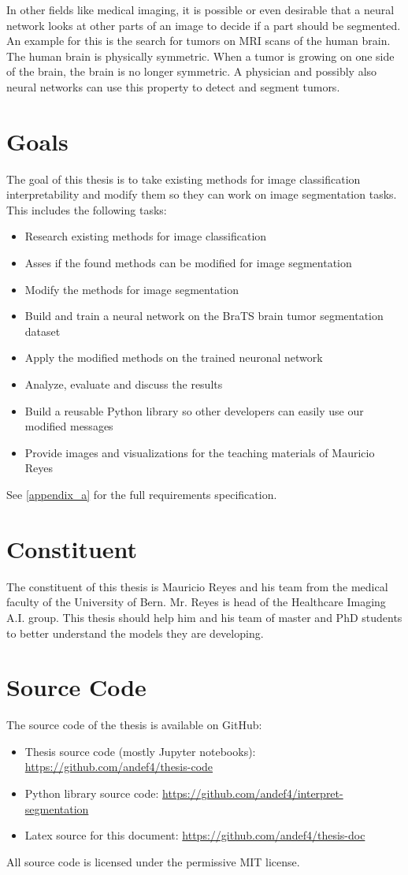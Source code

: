 In other fields like medical imaging, it is possible or even desirable that a neural network looks at other parts of an image to decide if a part should be segmented. An example for this is the search for tumors on MRI scans of the human brain. The human brain is physically symmetric. When a tumor is growing on one side of the brain, the brain is no longer symmetric. A physician and possibly also neural networks can use this property to detect and segment tumors.

\section{Goals}
The goal of this thesis is to take existing methods for image classification interpretability and modify them so they can work on image segmentation tasks. This includes the following tasks:
\begin{itemize}
    \item Research existing methods for image classification
    \item Asses if the found methods can be modified for image segmentation
    \item Modify the methods for image segmentation
    \item Build and train a neural network on the BraTS brain tumor segmentation dataset
    \item Apply the modified methods on the trained neuronal network
    \item Analyze, evaluate and discuss the results
    \item Build a reusable Python library so other developers can easily use our modified messages
    \item Provide images and visualizations for the teaching materials of Mauricio Reyes
\end{itemize}

See \autoref{appendix_a} for the full requirements specification.

\section{Constituent}
The constituent of this thesis is Mauricio Reyes and his team from the medical faculty of the University of Bern. Mr. Reyes is head of the Healthcare Imaging A.I. group. This thesis should help him and his team of master and PhD students to better understand the models they are developing.

\section{Source Code}
The source code of the thesis is available on GitHub:
\begin{itemize}
    \item Thesis source code (mostly Jupyter notebooks): \url{https://github.com/andef4/thesis-code}
    \item Python library source code: \url{https://github.com/andef4/interpret-segmentation}
    \item Latex source for this document: \url{https://github.com/andef4/thesis-doc}
\end{itemize}

All source code is licensed under the permissive MIT license.

